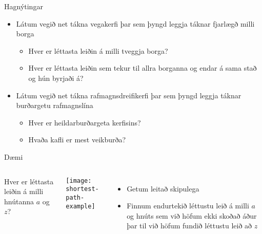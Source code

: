 \documentclass[handout]{beamer}
\begin{document}
\begin{frame}{Hagnýtingar}
\begin{itemize}
 \item Látum vegið net tákna vegakerfi þar sem þyngd leggja táknar fjarlægð milli borga
 \begin{itemize}
  \item Hver er léttasta leiðin á milli tveggja borga?
  \item Hver er léttasta leiðin sem tekur til allra borganna og endar á sama stað og hún byrjaði á?
 \end{itemize}
 \item Látum vegið net tákna rafmagnsdreifikerfi þar sem þyngd leggja táknar burðargetu rafmagnslína
 \begin{itemize}
  \item Hver er heildarburðargeta kerfisins?
  \item Hvaða kafli er mest veikburða?
 \end{itemize}
\end{itemize}
\end{frame}

\begin{frame}{Dæmi}
\begin{columns}
Hver er léttasta leiðin á milli hnútanna $a$ og $z$?
\begin{center}
\texttt{[image: shortest-path-example]}
\end{center}
\begin{itemize}
 \item Getum leitað skipulega
 \item Finnum endurtekið léttustu leið á milli $a$ og hnúts sem við höfum ekki skoðað áður þar til við höfum fundið léttustu leið að $z$
\end{itemize}
\end{columns}
\end{frame}
\end{document}
